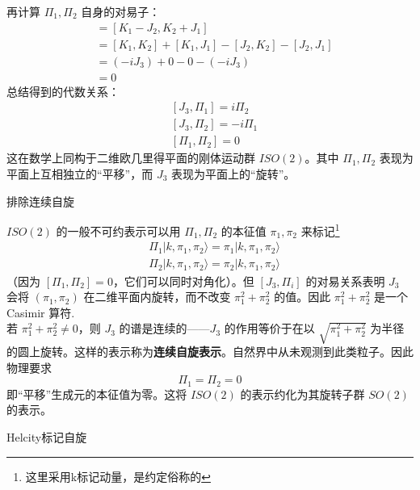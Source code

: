 再计算 $\Pi_1, \Pi_2$ 自身的对易子：
\begin{align}
    [\Pi_1, \Pi_2] &= [K_1 - J_2, K_2 + J_1] \nonumber \\
    &= [K_1, K_2] + [K_1, J_1] - [J_2, K_2] - [J_2, J_1] \nonumber \\
    &= (-iJ_3) + 0 - 0 - (-iJ_3) \nonumber \\
    &= 0
\end{align}
总结得到的代数关系：
\begin{subequations}
    \begin{align}
        & [J_3, \Pi_1] = i\Pi_2 \\
        & [J_3, \Pi_2] = -i\Pi_1 \\
        & [\Pi_1, \Pi_2] = 0
    \end{align}
\end{subequations}
这在数学上同构于二维欧几里得平面的刚体运动群 $ISO(2)$。其中 $\Pi_1, \Pi_2$ 表现为平面上互相独立的“平移”，而 $J_3$ 表现为平面上的“旋转”。
\begin{center}\vspace{2ex}
\large 排除连续自旋
\vspace{2ex}\end{center}
$ISO(2)$ 的一般不可约表示可以用 $\Pi_1,\Pi_2$ 的本征值 $\pi_1,\pi_2$ 来标记\footnote{这里采用k标记动量，是约定俗称的}
\begin{subequations}
    \begin{align}
        & \Pi_1|k,\pi_1,\pi_2\rangle = \pi_1 |k,\pi_1,\pi_2\rangle \\
        & \Pi_2|k,\pi_1,\pi_2\rangle = \pi_2 |k,\pi_1,\pi_2\rangle
    \end{align}
\end{subequations}
（因为 $[\Pi_1,\Pi_2]=0$，它们可以同时对角化）。\color{blue}但 $[J_3,\Pi_i]$ 的对易关系表明 $J_3$ 会将 $(\pi_1,\pi_2)$ 在二维平面内旋转，而不改变 $\pi_1^2+\pi_2^2$ 的值。因此 $\pi_1^2+\pi_2^2$ 是一个 Casimir 算符.\normalcolor
\vspace{2ex}
\\
若 $\pi_1^2+\pi_2^2 \neq 0$，则 $J_3$ 的谱是连续的——$J_3$ 的作用等价于在以 $\sqrt{\pi_1^2+\pi_2^2}$ 为半径的圆上旋转。这样的表示称为\textbf{连续自旋表示}。自然界中从未观测到此类粒子。因此物理要求
\begin{equation}
\Pi_1 = \Pi_2 = 0
\end{equation}
即``平移''生成元的本征值为零。这将 $ISO(2)$ 的表示约化为其旋转子群 $SO(2)$ 的表示。
\begin{center}\vspace{2ex}
\large Helcity标记自旋
\vspace{2ex}\end{center}
